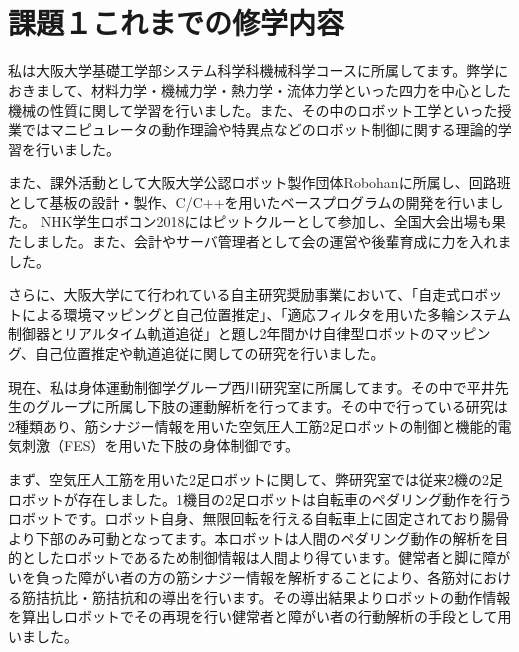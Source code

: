 \documentclass[a4paper,twocolumn]{jsarticle}
\begin{document}
    \ \\
    \ \\
    \section{課題１これまでの修学内容}
    私は大阪大学基礎工学部システム科学科機械科学コースに所属してます。弊学におきまして、材料力学・機械力学・熱力学・流体力学といった四力を中心とした機械の性質に関して学習を行いました。また、その中のロボット工学といった授業ではマニピュレータの動作理論や特異点などのロボット制御に関する理論的学習を行いました。

    また、課外活動として大阪大学公認ロボット製作団体Robohanに所属し、回路班として基板の設計・製作、C/C++を用いたベースプログラムの開発を行いました。 NHK学生ロボコン2018にはピットクルーとして参加し、全国大会出場も果たしました。また、会計やサーバ管理者として会の運営や後輩育成に力を入れました。

    さらに、大阪大学にて行われている自主研究奨励事業において、「自走式ロボットによる環境マッピングと自己位置推定」、「適応フィルタを用いた多輪システム制御器とリアルタイム軌道追従」と題し2年間かけ自律型ロボットのマッピング、自己位置推定や軌道追従に関しての研究を行いました。

    現在、私は身体運動制御学グループ西川研究室に所属してます。その中で平井先生のグループに所属し下肢の運動解析を行ってます。その中で行っている研究は2種類あり、筋シナジー情報を用いた空気圧人工筋2足ロボットの制御と機能的電気刺激（FES）を用いた下肢の身体制御です。

    まず、空気圧人工筋を用いた2足ロボットに関して、弊研究室では従来2機の2足ロボットが存在しました。1機目の2足ロボットは自転車のペダリング動作を行うロボットです。ロボット自身、無限回転を行える自転車上に固定されており腸骨より下部のみ可動となってます。本ロボットは人間のペダリング動作の解析を目的としたロボットであるため制御情報は人間より得ています。健常者と脚に障がいを負った障がい者の方の筋シナジー情報を解析することにより、各筋対における筋拮抗比・筋拮抗和の導出を行います。その導出結果よりロボットの動作情報を算出しロボットでその再現を行い健常者と障がい者の行動解析の手段として用いました。\\
    \ \\
    \\
\end{document}
